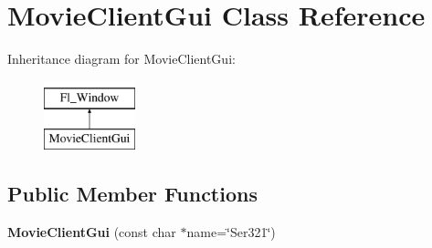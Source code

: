 \hypertarget{class_movie_client_gui}{}\section{Movie\+Client\+Gui Class Reference}
\label{class_movie_client_gui}
Inheritance diagram for Movie\+Client\+Gui\+:\begin{figure}[H]
\begin{center}
\leavevmode
\includegraphics[height=2.000000cm]{class_movie_client_gui}
\end{center}
\end{figure}
\subsection*{Public Member Functions}
\begin{DoxyCompactItemize}
\item 
\hypertarget{class_movie_client_gui_a02ffc909104a55817d6608dfe35222f8}{}{\bfseries Movie\+Client\+Gui} (const char $\ast$name=\char`\"{}Ser321\char`\"{})\label{class_movie_client_gui_a02ffc909104a55817d6608dfe35222f8}

\end{DoxyCompactItemize}
